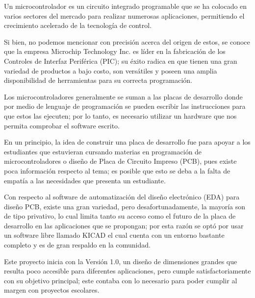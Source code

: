 \documentclass[times, 10pt,twocolumn]{article}
\begin{document}
Un microcontrolador es un circuito integrado programable que se ha colocado en varios sectores del mercado para realizar numerosas aplicaciones, permitiendo el crecimiento acelerado de la tecnología de control.

Si bien, no podemos mencionar con precisión acerca del origen de estos, se conoce que la empresa Microchip Technology Inc. es líder en la fabricación de los Controles de Interfaz Periférica (PIC); su éxito radica en que tienen una gran variedad de productos a bajo costo, son versátiles
y poseen una amplia disponibilidad de herramientas para su correcta programación.~\cite{ex1}

Los microcontroladores generalmente se suman a las placas de desarrollo donde por medio de lenguaje de programación se pueden escribir las instrucciones para que estos las ejecuten; por lo tanto, es necesario utilizar un hardware que nos permita comprobar el software escrito.

En un principio, la idea de construir una placa de desarrollo fue para apoyar a los estudiantes que estuvieran cursando materias en programación de microcontroladores o diseño de Placa de Circuito Impreso (PCB), pues existe poca información respecto al tema; es posible que esto se deba a la falta de empatía a las necesidades que presenta un estudiante.

Con respecto al software de automatización del diseño electrónico (EDA) para diseño PCB, existe una gran variedad, pero desafortunadamente, la mayoría son de tipo privativo, lo cual limita tanto su acceso como el futuro de la placa de desarrollo en las aplicaciones que se propongan; por esta razón se optó por usar un software libre llamado KICAD el cual cuenta con un entorno bastante completo y es de gran respaldo en la comunidad.~\cite{ex2}

Este proyecto inicia con la Versión 1.0, un diseño de dimensiones grandes que resulta poco accesible para diferentes aplicaciones, pero cumple satisfactoriamente con su objetivo principal; este contaba con lo necesario para poder cumplir al margen con proyectos escolares.
\end{document}
